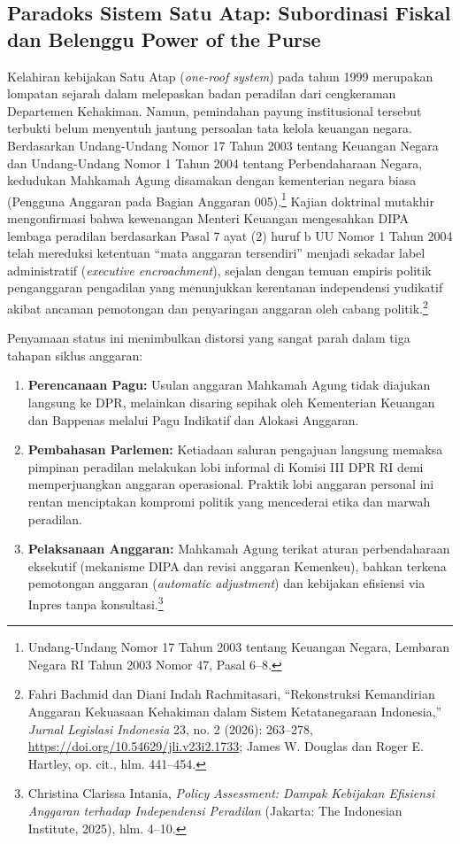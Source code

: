 \documentclass[12pt,a4paper,twocolumn]{article}
\begin{document}
\subsection{Paradoks Sistem Satu Atap: Subordinasi Fiskal dan Belenggu Power of the Purse}

Kelahiran kebijakan Satu Atap (\textit{one-roof system}) pada tahun 1999 merupakan lompatan sejarah dalam melepaskan badan peradilan dari cengkeraman Departemen Kehakiman. Namun, pemindahan payung institusional tersebut terbukti belum menyentuh jantung persoalan tata kelola keuangan negara. Berdasarkan Undang-Undang Nomor 17 Tahun 2003 tentang Keuangan Negara dan Undang-Undang Nomor 1 Tahun 2004 tentang Perbendaharaan Negara, kedudukan Mahkamah Agung disamakan dengan kementerian negara biasa (Pengguna Anggaran pada Bagian Anggaran 005).\footnote{Undang-Undang Nomor 17 Tahun 2003 tentang Keuangan Negara, Lembaran Negara RI Tahun 2003 Nomor 47, Pasal 6--8.} Kajian doktrinal mutakhir mengonfirmasi bahwa kewenangan Menteri Keuangan mengesahkan DIPA lembaga peradilan berdasarkan Pasal 7 ayat (2) huruf b UU Nomor 1 Tahun 2004 telah mereduksi ketentuan ``mata anggaran tersendiri'' menjadi sekadar label administratif (\textit{executive encroachment}), sejalan dengan temuan empiris politik penganggaran pengadilan yang menunjukkan kerentanan independensi yudikatif akibat ancaman pemotongan dan penyaringan anggaran oleh cabang politik.\footnote{Fahri Bachmid dan Diani Indah Rachmitasari, ``Rekonstruksi Kemandirian Anggaran Kekuasaan Kehakiman dalam Sistem Ketatanegaraan Indonesia,'' \textit{Jurnal Legislasi Indonesia} 23, no. 2 (2026): 263--278, \url{https://doi.org/10.54629/jli.v23i2.1733}; James W. Douglas dan Roger E. Hartley, op. cit., hlm. 441--454.}

Penyamaan status ini menimbulkan distorsi yang sangat parah dalam tiga tahapan siklus anggaran:
\begin{enumerate}
    \item \textbf{Perencanaan Pagu:} Usulan anggaran Mahkamah Agung tidak diajukan langsung ke DPR, melainkan disaring sepihak oleh Kementerian Keuangan dan Bappenas melalui Pagu Indikatif dan Alokasi Anggaran.
    \item \textbf{Pembahasan Parlemen:} Ketiadaan saluran pengajuan langsung memaksa pimpinan peradilan melakukan lobi informal di Komisi III DPR RI demi memperjuangkan anggaran operasional. Praktik lobi anggaran personal ini rentan menciptakan kompromi politik yang mencederai etika dan marwah peradilan.
    \item \textbf{Pelaksanaan Anggaran:} Mahkamah Agung terikat aturan perbendaharaan eksekutif (mekanisme DIPA dan revisi anggaran Kemenkeu), bahkan terkena pemotongan anggaran (\textit{automatic adjustment}) dan kebijakan efisiensi via Inpres tanpa konsultasi.\footnote{Christina Clarissa Intania, \textit{Policy Assessment: Dampak Kebijakan Efisiensi Anggaran terhadap Independensi Peradilan} (Jakarta: The Indonesian Institute, 2025), hlm. 4--10.}
\end{enumerate}
\end{document}
